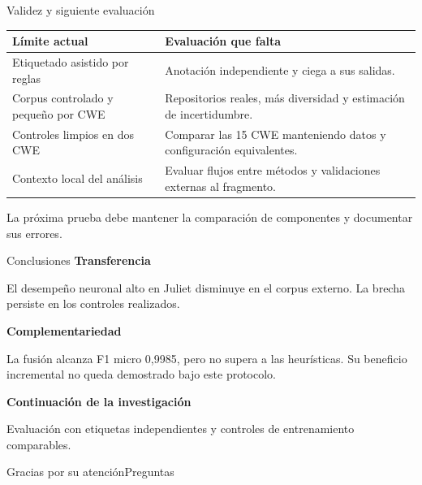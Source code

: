 \begin{frame}{Validez y siguiente evaluación}
\small
\begin{tabularx}{\textwidth}{@{}p{48mm}X@{}}
\toprule
\textbf{Límite actual} & \textbf{Evaluación que falta}\\\midrule
Etiquetado asistido por reglas & Anotación independiente y ciega a sus salidas.\\[3mm]
Corpus controlado y pequeño por CWE & Repositorios reales, más diversidad y estimación de incertidumbre.\\[3mm]
Controles limpios en dos CWE & Comparar las 15 CWE manteniendo datos y configuración equivalentes.\\[3mm]
Contexto local del análisis & Evaluar flujos entre métodos y validaciones externas al fragmento.\\\bottomrule
\end{tabularx}
\par\vspace{5mm}\normalsize
La próxima prueba debe mantener la comparación de componentes y documentar sus errores.
\end{frame}

\begin{frame}{Conclusiones}
\textbf{Transferencia}\par\vspace{2mm}
El desempeño neuronal alto en Juliet disminuye en el corpus externo. La brecha persiste en los controles realizados.
\par\vspace{5mm}
\textbf{Complementariedad}\par\vspace{2mm}
La fusión alcanza F1 micro 0,9985, pero no supera a las heurísticas. Su beneficio incremental no queda demostrado bajo este protocolo.
\par\vspace{5mm}
\textbf{Continuación de la investigación}\par\vspace{2mm}
Evaluación con etiquetas independientes y controles de entrenamiento comparables.
\par\vspace{5mm}
{\color{Navy}\large Gracias por su atención}\hfill Preguntas
\end{frame}

\appendix
\inappendixtrue

